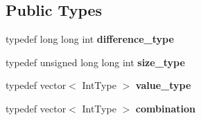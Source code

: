 \subsection*{Public Types}
\begin{DoxyCompactItemize}
\item 
\hypertarget{classdscr_1_1basic__combinations_a1e2009c3ffa76ac7c4e18016abbd920d}{typedef long long int {\bfseries difference\-\_\-type}}\label{classdscr_1_1basic__combinations_a1e2009c3ffa76ac7c4e18016abbd920d}

\item 
\hypertarget{classdscr_1_1basic__combinations_a93972e9ce95005164c165c5ecfcb1b41}{typedef unsigned long long int {\bfseries size\-\_\-type}}\label{classdscr_1_1basic__combinations_a93972e9ce95005164c165c5ecfcb1b41}

\item 
\hypertarget{classdscr_1_1basic__combinations_a7fe2516646aab1845fe75b5b6e31e264}{typedef vector$<$ Int\-Type $>$ {\bfseries value\-\_\-type}}\label{classdscr_1_1basic__combinations_a7fe2516646aab1845fe75b5b6e31e264}

\item 
\hypertarget{classdscr_1_1basic__combinations_aad2a97982e0824740f2ac07a07c51863}{typedef vector$<$ Int\-Type $>$ {\bfseries combination}}\label{classdscr_1_1basic__combinations_aad2a97982e0824740f2ac07a07c51863}

\end{DoxyCompactItemize}

